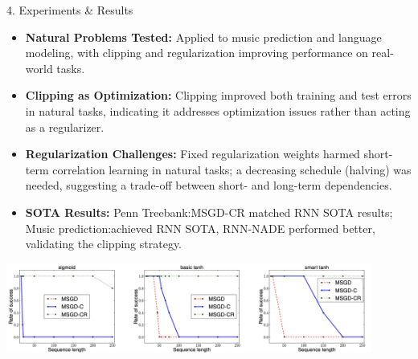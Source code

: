 \documentclass[final]{beamer}
\begin{document}
\begin{frame}[t]
\begin{columns}[t,totalwidth=\textwidth]
\begin{column}{0.3\textwidth}
\begin{block}{4. Experiments \& Results}
\begin{itemize}
    \item \justifying \textbf{Natural Problems Tested:} Applied to music prediction and language modeling, with clipping and regularization improving performance on real-world tasks.
    
    \item \justifying \textbf{Clipping as Optimization:} Clipping improved both training and test errors in natural tasks, indicating it addresses optimization issues rather than acting as a regularizer.  

    \item \justifying \textbf{Regularization Challenges:} Fixed regularization weights harmed short-term correlation learning in natural tasks; a decreasing schedule (halving) was needed, suggesting a trade-off between short- and long-term dependencies.  

    \item \justifying \textbf{SOTA Results:} Penn Treebank:MSGD-CR matched RNN SOTA results; Music prediction:achieved RNN SOTA, RNN-NADE performed better, validating the clipping strategy. 

  \end{itemize} %
\begin{center}
  \includegraphics[width=0.9\textwidth]{figures/results.png}
\end{center}



\end{block}
\end{column}
\end{columns}
\end{frame}
\end{document}
